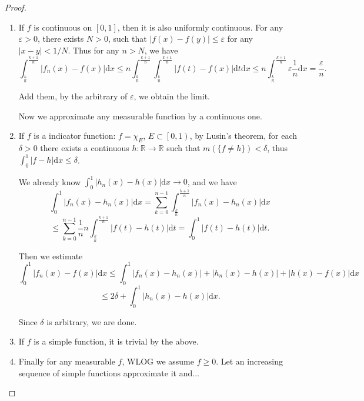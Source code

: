 \begin{proof}
	\begin{enumerate}
		\item If $ f $ is continuous on $ [0,1] $, then it is also uniformly continuous. For any $ \varepsilon>0 $, there exists $ N>0 $, such that $ \vert f(x)-f(y) \vert \le \varepsilon $ for any $ \vert x-y \vert<1/N $. Thus for any $ n>N $, we have
		      $$
			      \int_{\frac{k}{n}}^{\frac{k+1}{n}}{|f_n( x ) -f( x ) |\mathrm{d} x}\le n\int_{\frac{k}{n}}^{\frac{k+1}{n}}{\int_{\frac{k}{n}}^{\frac{k+1}{n}}{|f( t ) -f( x ) |\mathrm{d} t}\mathrm{d} x}\le n\int_{\frac{k}{n}}^{\frac{k+1}{n}}{\varepsilon \frac{1}{n}\mathrm{d} x}=\frac{\varepsilon}{n}.
		      $$

		      Add them, by the arbitrary of $ \varepsilon $, we obtain the limit.

		      Now we approximate any measurable function by a continuous one.
		\item If $ f $ is a indicator function: $ f=\chi_{E} $, $ E\subset \left[ 0,1\right) $, by Lusin's theorem, for each $ \delta>0 $ there exists a continuous $ h\colon\mathbb{R} \to \mathbb{R}   $ such that $ m(\{f\ne h\})<\delta $, thus $ \int_{0}^{1}\vert f-h \vert\mathrm{d}x\le \delta $.

		      We already know $
			      \int_0^1{|h_n( x ) -h( x ) |\mathrm{d} x}\rightarrow 0
		      $, and we have
		      $$
			      \int_0^1{|f_n( x ) -h_n( x ) |\mathrm{d} x}=\sum_{k=0}^{n-1}{\int_{\frac{k}{n}}^{\frac{k+1}{n}}{|f_n( x ) -h_n( x ) |\mathrm{d} x}}
		      $$
		      $$
			      \le \sum_{k=0}^{n-1}{\frac{1}{n}n\int_{\frac{k}{n}}^{\frac{k+1}{n}}{|f( t ) -h( t ) |\mathrm{d} t}}=\int_0^1{|f( t ) -h( t ) |\mathrm{d} t}.
		      $$

		      Then we estimate
		      $$
			      \int_0^1{|f_n( x ) -f( x ) |\mathrm{d} x}\le \int_0^1{|f_n( x ) -h_n( x ) |+|h_n( x ) -h( x ) |+|h( x ) -f( x ) |\mathrm{d} x}
		      $$
		      $$
			      \le 2\delta +\int_0^1{|h_n( x ) -h( x ) |\mathrm{d} x}.
		      $$

		      Since $ \delta $ is arbitrary, we are done.

		\item If $ f $ is a simple function, it is trivial by the above.

		\item Finally for any measurable $ f $, WLOG we assume $ f\ge 0 $. Let an increasing sequence of simple functions approximate it and...
	\end{enumerate}
\end{proof}

